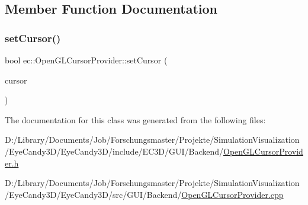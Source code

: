 \subsection{Member Function Documentation}
\mbox{\label{classec_1_1_open_g_l_cursor_provider_a1eadfdfdfeaac9f932bad8e16edfab3b}} 
\subsubsection{\texorpdfstring{set\+Cursor()}{setCursor()}}
{\footnotesize\ttfamily bool ec\+::\+Open\+G\+L\+Cursor\+Provider\+::set\+Cursor (\begin{DoxyParamCaption}\item[{Cursor\+Enum}]{cursor }\end{DoxyParamCaption})\hspace{0.3cm}{\ttfamily [override]}}



The documentation for this class was generated from the following files\+:\begin{DoxyCompactItemize}
\item 
D\+:/\+Library/\+Documents/\+Job/\+Forschungsmaster/\+Projekte/\+Simulation\+Visualization/\+Eye\+Candy3\+D/\+Eye\+Candy3\+D/include/\+E\+C3\+D/\+G\+U\+I/\+Backend/\mbox{\hyperlink{_open_g_l_cursor_provider_8h}{Open\+G\+L\+Cursor\+Provider.\+h}}\item 
D\+:/\+Library/\+Documents/\+Job/\+Forschungsmaster/\+Projekte/\+Simulation\+Visualization/\+Eye\+Candy3\+D/\+Eye\+Candy3\+D/src/\+G\+U\+I/\+Backend/\mbox{\hyperlink{_open_g_l_cursor_provider_8cpp}{Open\+G\+L\+Cursor\+Provider.\+cpp}}\end{DoxyCompactItemize}
